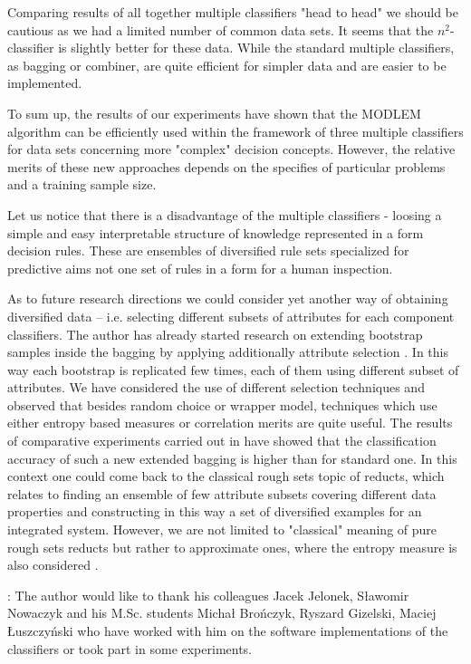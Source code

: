 \documentclass{llncs}
\begin{document}
Comparing results of all together multiple classifiers "head to head" we
should be cautious as we had a limited number of common data sets.
 It seems that the $n^2$-classifier is slightly
better for these data. While the standard multiple classifiers, as bagging
or combiner, are quite efficient for simpler data and are easier to be
implemented.


To sum up, the results of our experiments have shown that the MODLEM
algorithm can be efficiently used within the framework of three multiple
classifiers for data sets concerning more "complex" decision concepts.
However, the relative merits of these new approaches depends on the
specifies of particular problems and a training sample size.

Let us notice that there is a disadvantage of the multiple classifiers -
loosing a simple and easy interpretable structure of knowledge represented
in a form decision rules. These are  ensembles of diversified rule sets
specialized for predictive aims not one set of rules in a  form for a human
inspection.

As to future research directions we could consider yet another way of
obtaining diversified data -- i.e. selecting different subsets of attributes
for each component classifiers. The author has already started research on
extending bootstrap samples inside the bagging by applying additionally
attribute selection \cite{Stef05,StefKacz04}. In this way each bootstrap is
replicated few times, each of them using different subset of attributes. We
have considered the use of different selection techniques and observed that
besides random choice or wrapper model, techniques which use either entropy
based measures or correlation merits are quite useful. The results of
comparative experiments carried out in \cite{StefKacz04} have showed that
the classification accuracy of such a new extended bagging is higher than
for standard one. In this context one could come back to the classical rough
sets topic of reducts, which relates to finding an ensemble of few attribute
subsets covering different data properties and constructing in this way a
set of diversified examples for an integrated system. However, we are not
limited to "classical" meaning of pure rough sets reducts but rather to
approximate ones, where the entropy measure is also considered
\cite{slezak}.

: The author would like to thank  his
colleagues Jacek Jelonek, S{\l}awomir Nowaczyk and  his M.Sc. students
Micha{\l} Bro\'nczyk, Ryszard Gizelski, Maciej {\L}uszczy\'nski who have
worked with him on the software implementations of the classifiers or took
part in some experiments.
\end{document}
